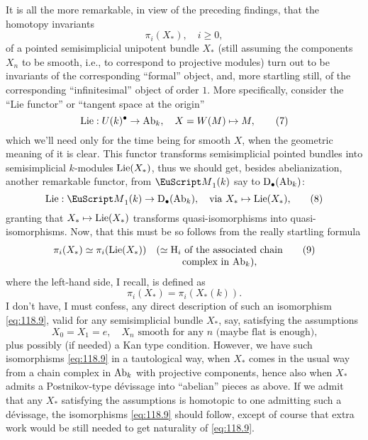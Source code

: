 \label{sec:118}%
It is all the more remarkable, in view of the preceding findings, that
the homotopy invariants
\[\pi_i(X_*), \quad i\ge0,\]
of a pointed semisimplicial unipotent bundle $X_*$ (still assuming the
components $X_n$ to be smooth, i.e., to correspond to projective
modules) turn out to be invariants of the corresponding ``formal''
object, and, more startling still, of the corresponding
``infinitesimal'' object of order $1$. More specifically, consider the
``Lie functor'' or ``tangent space at the origin''
\begin{equation}
  \label{eq:118.7}
  \operatorname{Lie}: U(k)^\bullet \to \operatorname{Ab}_k, \quad X=W(M)\mapsto M,\tag{7}
\end{equation}
which we'll need only for the time being for smooth $X$, when the
geometric meaning of it is clear. This functor transforms
semisimplicial pointed bundles into semisimplicial $k$-modules
$\operatorname{Lie}(X_*)$, thus we should get, besides abelianization, another
remarkable functor, from $\scrM_1(k)$ say to ${\mathrm{D}}_\bullet(\operatorname{Ab}_k)$:
\begin{equation}
  \label{eq:118.8}
  \Lie: \scrM_1(k)\to\D_\bullet(\AbOf_k), \quad \text{via $X_*\mapsto
    \Lie(X_*)$,}\tag{8} 
\end{equation}
granting that $X_*\mapsto\operatorname{Lie}(X_*)$ transforms quasi-isomorphisms into
quasi-isomorphisms. Now, that this must be so follows from the really
startling formula
\begin{equation}
  \label{eq:118.9}
  \pi_i(X_*)\simeq\pi_i(\Lie(X_*)) \quad
  \begin{tabular}[t]{@{}c@{}}
    ($\simeq\mathrm{H}_i$ of
    the associated chain\\
    complex in $\AbOf_k$),
  \end{tabular}\tag{9}
\end{equation}
where the left-hand side, I recall, is defined as
\begin{equation}
  \label{eq:118.10}
  \pi_i(X_*)=\pi_i(X_*(k)).\tag{10}
\end{equation}
I don't have, I must confess, any direct description of
such an isomorphism \eqref{eq:118.9}, valid for any semisimplicial
bundle $X_*$, say, satisfying the assumptions
\[X_0=X_1=e, \quad \text{$X_n$ smooth for any $n$ (maybe flat is
    enough),}\]
plus possibly (if needed) a Kan type condition. However, we have such
isomorphisms \eqref{eq:118.9} in a tautological way, when $X_*$ comes
in the usual way from a chain complex in $\operatorname{Ab}_k$ with projective
components, hence also when $X_*$ admits a Postnikov-type dévissage
into ``abelian'' pieces as above. If we admit that any $X_*$
satisfying the assumptions is homotopic to one admitting such a
dévissage, the isomorphisms \eqref{eq:118.9} should follow, except of
course that extra work would be still needed to get naturality of
\eqref{eq:118.9}.

